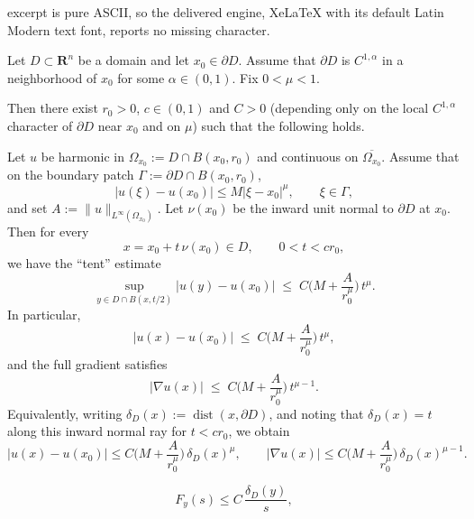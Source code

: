 \documentclass[10pt,a4paper]{amsart}
\newcommand{\dist}{\operatorname{dist}}
\begin{document}
excerpt is pure ASCII, so the delivered engine, XeLaTeX with its default Latin Modern text font, reports no missing character.
\begin{lemma}
\label{lem:anchored_holder_to_grad_normal}
Let $D\subset\mathbf R^n$ be a domain and let $x_0\in\partial D$.
Assume that $\partial D$ is $C^{1,\alpha}$ in a neighborhood of $x_0$ for some $\alpha\in(0,1)$.
Fix $0<\mu< 1$.

Then there exist $r_0>0$, $c\in(0,1)$ and $C>0$ (depending only on the local $C^{1,\alpha}$ character
of $\partial D$ near $x_0$ and on $\mu$) such that the following holds.

Let $u$ be harmonic in $\Omega_{x_0}:=D\cap B(x_0,r_0)$ and continuous on $\overline{\Omega_{x_0}}$.
Assume that on the boundary patch $\Gamma:=\partial D\cap B(x_0,r_0)$,
\begin{equation}\label{eq:anchored_holder_bd_combined}
|u(\xi)-u(x_0)|\le M|\xi-x_0|^\mu,\qquad \xi\in\Gamma,
\end{equation}
and set $A:=\|u\|_{L^\infty(\Omega_{x_0})}$.
Let $\nu(x_0)$ be the inward unit normal to $\partial D$ at $x_0$.
\\
Then for every
\[
x=x_0+t\,\nu(x_0)\in D,\qquad 0<t<cr_0,
\]
we have the ``tent'' estimate
\begin{equation}\label{eq:tent_holder_combined}
\sup_{y\in D\cap B(x,t/2)} |u(y)-u(x_0)|
\;\le\; C\Big(M+\frac{A}{r_0^\mu}\Big)\,t^\mu.
\end{equation}
In particular,
\begin{equation}\label{eq:holder_normal_combined}
|u(x)-u(x_0)|
\;\le\; C\Big(M+\frac{A}{r_0^\mu}\Big)\,t^\mu,
\end{equation}
and the full gradient satisfies
\begin{equation}\label{eq:grad_normal_combined}
|\nabla u(x)|
\;\le\; C\Big(M+\frac{A}{r_0^\mu}\Big)\,t^{\mu-1}.
\end{equation}
Equivalently, writing $\delta_D(x):=\dist(x,\partial D)$, and noting that
$\delta_D(x)=t$ along this inward normal ray for $t<cr_0$, we obtain
\[
|u(x)-u(x_0)|\le C\Big(M+\frac{A}{r_0^\mu}\Big)\,\delta_D(x)^\mu,
\qquad
|\nabla u(x)|\le C\Big(M+\frac{A}{r_0^\mu}\Big)\,\delta_D(x)^{\mu-1}.
\]
\end{lemma}

\begin{equation}\label{eq:Fy_decay_combined}
F_y(s)\le C\,\frac{\delta_D(y)}{s},
\end{equation}
\end{document}
